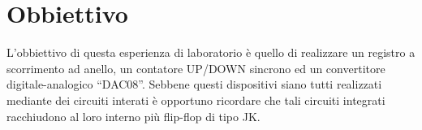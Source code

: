 \section*{Obbiettivo}

L'obbiettivo di questa esperienza di laboratorio è quello di realizzare un registro a scorrimento ad anello, un contatore UP/DOWN sincrono ed un convertitore digitale-analogico ``DAC08''. Sebbene questi dispositivi siano tutti realizzati mediante dei circuiti interati è opportuno ricordare che tali circuiti integrati racchiudono al loro interno più flip-flop di tipo JK.